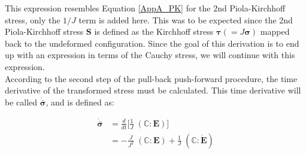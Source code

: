 This expression resembles Equation \ref{AppA_PK} for the 2nd Piola-Kirchhoff stress, only the $1/J$ term is added here. This was to be expected since the 2nd Piola-Kirchhoff stress $\boldsymbol{S}$ is defined as the Kirchhoff stress $\boldsymbol{\tau}(=J\boldsymbol{\sigma})$ mapped back to the undeformed configuration. Since the goal of this derivation is to end up with an expression in terms of the Cauchy stress, we will continue with this expression.\\
\newline
According to the second step of the pull-back push-forward procedure, the time derivative of the transformed stress must be calculated. This time derivative will be called $\dot{\bar{\boldsymbol{\sigma}}}$, and is defined as:

\begin{equation}
\begin{split}
\dot{\bar{\boldsymbol{\sigma}}} &= \frac{d}{dt}\big[\frac{1}{J}\;(\boldsymbol{\mathbb C}:\boldsymbol{E})\big]\\
&= -\frac{\dot{J}}{J^2}\;(\boldsymbol{\mathbb C}:\boldsymbol{E}) + \frac{1}{J}\;(\boldsymbol{\mathbb C}:\dot{\boldsymbol{E}})
\end{split}
\end{equation}

